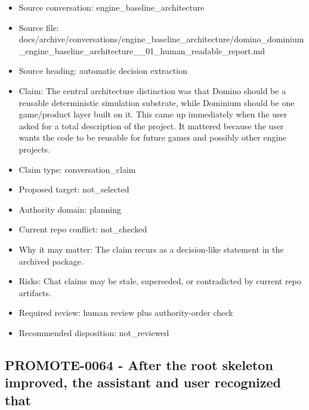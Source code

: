 \documentclass[11pt,a4paper]{report}
\begin{document}
\begin{itemize}
\item Source conversation: engine\_baseline\_architecture
\item Source file: docs/archive/conversations/engine\_baseline\_architecture/domino\_dominium\_engine\_baseline\_architecture\_\_01\_human\_readable\_report.md
\item Source heading: automatic decision extraction
\item Claim: The central architecture distinction was that Domino should be a reusable deterministic simulation substrate, while Dominium should be one game/product layer built on it. This came up immediately when the user asked for a total description of the project. It mattered because the user wants the code to be reusable for future games and possibly other engine projects.
\item Claim type: conversation\_claim
\item Proposed target: not\_selected
\item Authority domain: planning
\item Current repo conflict: not\_checked
\item Why it may matter: The claim recurs as a decision-like statement in the archived package.
\item Risks: Chat claims may be stale, superseded, or contradicted by current repo artifacts.
\item Required review: human review plus authority-order check
\item Recommended disposition: not\_reviewed
\end{itemize}

\subsection{PROMOTE-0064 - After the root skeleton improved, the assistant and user recognized that}
\end{document}
